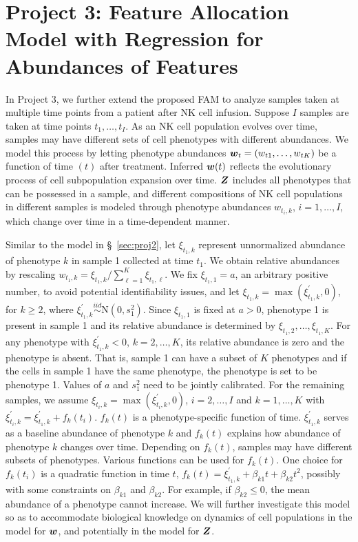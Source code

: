 \documentclass[12pt,]{article}
\newcommand{\N}{ \mathcal{N} }
\newcommand{\iid}{\overset{iid}{\sim}}
\def\N{\text{N}}
\newcommand{\bZ}{\mbox{\boldmath $Z$}}
\newcommand{\bw}{\mbox{\boldmath $w$}}
\begin{document}
\section{Project 3: Feature Allocation Model with Regression for Abundances of
Features}\label{sec:proj3}
In Project 3, we further extend the proposed FAM to analyze samples taken at
multiple time points from a patient after NK cell infusion. Suppose $I$ samples
are taken at time points $t_1, \ldots, t_I$.   As an NK cell population evolves
over time, samples may have different sets of cell phenotypes with different
abundances. We model this process by letting phenotype abundances
$\bw_{t}=(w_{t1}, \ldots, w_{tK})$ be a function of time $(t)$ after treatment.
Inferred $\bw(t)$ reflects the evolutionary process of cell subpopulation
expansion over time.   $\bZ$ includes all phenotypes that can be possessed in a
sample, and different compositions of NK cell populations in different samples is
modeled through phenotype abundances $w_{t_i, k}$, $i=1, \ldots, I$, which
change over time in a time-dependent manner.


Similar to the model in \S~\ref{sec:proj2}, let $\xi_{t_1,k}$ represent
unnormalized abundance of phenotype $k$ in sample 1 collected at time $t_1$.
We obtain relative abundances by rescaling $w_{t_1,k}=
\xi_{t_1,k}/\sum_{\ell=1}^K \xi_{t_1, \ell}$.  We fix $\xi_{t_1,1}=a$, an
arbitrary positive number, to avoid potential identifiability issues, and let
$\xi_{t_1,k} = \max(\xi^\prime_{t_1,k}, 0)$, for $k\ge 2$, where
$\xi^\prime_{t_1,k} \iid \N(0, s^2_1)$.  Since $\xi_{t_1, 1}$ is fixed at
$a>0$, phenotype 1 is present in sample 1 and its relative abundance is
determined by $\xi_{t_1, 2}, \ldots, \xi_{t_1, K}$.  For any phenotype with
$\xi^\prime_{t_1, k} < 0$, $k=2, \ldots, K$, its relative abundance is zero and
the phenotype is absent.  That is, sample 1 can have a subset of $K$ phenotypes
and if the cells in sample 1 have the same phenotype, the phenotype is set to be
phenotype 1. Values of $a$ and $s^2_1$ need to be jointly calibrated. For the
remaining samples, we assume $\xi_{t_i,k} = \max(\xi^\prime_{t_i,k}, 0)$, $i=2,
\ldots, I$ and $k=1, \ldots, K$ with $\xi^\prime_{t_i,k} = \xi^\prime_{t_1, k}
+ f_k(t_i)$. $f_k(t)$ is a phenotype-specific function of time.
$\xi^\prime_{t_1, k}$ serves as a baseline abundance of phenotype $k$ and
$f_k(t)$ explains how abundance of phenotype $k$ changes over time.
Depending on $f_k(t)$, samples may have different subsets of phenotypes.
Various functions can be used for $f_k(t)$.  One choice for $f_k(t_i)$ is a
quadratic function in time $t$, $f_k(t) = \xi^\prime_{t_1,k} + \beta_{k1}t +
\beta_{k2}t^2$, possibly with some constraints on $\beta_{k1}$ and
$\beta_{k2}.$  For example, if $\beta_{k2} \leq 0$, the mean abundance of a
phenotype cannot increase.  We will further investigate this model so as to
accommodate biological knowledge on dynamics of cell populations in the model
for $\bw$, and potentially in the model for $\bZ$.   
\end{document}
